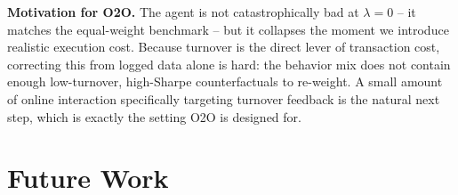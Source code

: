\textbf{Motivation for O2O.}  The agent is not catastrophically bad at
$\lambda = 0$ -- it matches the equal-weight benchmark -- but it
collapses the moment we introduce realistic execution cost.  Because
turnover is the direct lever of transaction cost, correcting this from
logged data alone is hard: the behavior mix does not contain enough
low-turnover, high-Sharpe counterfactuals to re-weight.  A small amount
of online interaction specifically targeting turnover feedback is the
natural next step, which is exactly the setting O2O is designed for.

\section{Future Work}

